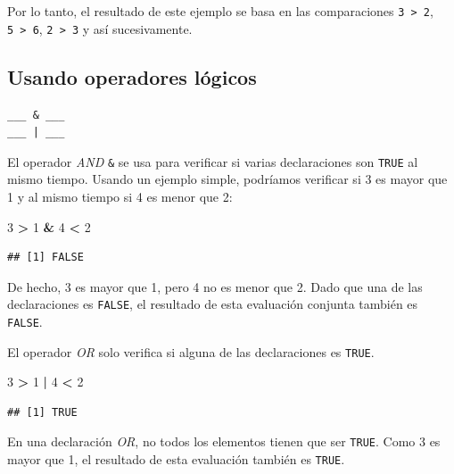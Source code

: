 \documentclass[
]{book}
\newenvironment{Shaded}{\begin{snugshade}}{\end{snugshade}}
\newcommand{\DecValTok}[1]{\textcolor[rgb]{0.00,0.00,0.81}{#1}}
\newcommand{\OperatorTok}[1]{\textcolor[rgb]{0.81,0.36,0.00}{\textbf{#1}}}
\newcommand{\StringTok}[1]{\textcolor[rgb]{0.31,0.60,0.02}{#1}}
\begin{document}
Por lo tanto, el resultado de este ejemplo se basa en las comparaciones \texttt{3\ \textgreater{}\ 2}, \texttt{5\ \textgreater{}\ 6}, \texttt{2\ \textgreater{}\ 3} y así sucesivamente.

\hypertarget{usando-operadores-luxf3gicos}{%
\subsection{Usando operadores lógicos}\label{usando-operadores-luxf3gicos}}

\begin{verbatim}
___ & ___
___ | ___
\end{verbatim}

El operador \emph{AND} \texttt{\&} se usa para verificar si varias declaraciones son \texttt{TRUE} al mismo tiempo. Usando un ejemplo simple, podríamos verificar si 3 es mayor que 1 y al mismo tiempo si 4 es menor que 2:

\begin{Shaded}
\begin{Highlighting}[]
\DecValTok{3} \OperatorTok{>}\StringTok{ }\DecValTok{1} \OperatorTok{&}\StringTok{ }\DecValTok{4} \OperatorTok{<}\StringTok{ }\DecValTok{2}
\end{Highlighting}
\end{Shaded}

\begin{verbatim}
## [1] FALSE
\end{verbatim}

De hecho, 3 es mayor que 1, pero 4 no es menor que 2. Dado que una de las declaraciones es \texttt{FALSE}, el resultado de esta evaluación conjunta también es \texttt{FALSE}.

El operador \emph{OR} \texttt{\textbar{}} solo verifica si alguna de las declaraciones es \texttt{TRUE}.

\begin{Shaded}
\begin{Highlighting}[]
\DecValTok{3} \OperatorTok{>}\StringTok{ }\DecValTok{1} \OperatorTok{|}\StringTok{ }\DecValTok{4} \OperatorTok{<}\StringTok{ }\DecValTok{2}
\end{Highlighting}
\end{Shaded}

\begin{verbatim}
## [1] TRUE
\end{verbatim}

En una declaración \emph{OR}, no todos los elementos tienen que ser \texttt{TRUE}. Como 3 es mayor que 1, el resultado de esta evaluación también es \texttt{TRUE}.
\end{document}
